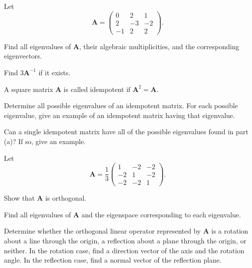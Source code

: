 \begin{problem}
Let
\[
\mathbf A=
\begin{pmatrix}
0&2&1\\
2&-3&-2\\
-1&2&2
\end{pmatrix}.
\]
\begin{problemsubparts}
\item Find all eigenvalues of $\mathbf A$, their algebraic multiplicities, and the corresponding eigenvectors.
\item Find $3\mathbf A^{-1}$ if it exists.
\end{problemsubparts}
\end{problem}

\begin{problem}
A square matrix $\mathbf A$ is called idempotent if $\mathbf A^2=\mathbf A$.
\begin{problemsubparts}
\item Determine all possible eigenvalues of an idempotent matrix. For each possible eigenvalue, give an example of an idempotent matrix having that eigenvalue.
\item Can a single idempotent matrix have all of the possible eigenvalues found in part \textup{(a)}? If so, give an example.
\end{problemsubparts}
\end{problem}

\begin{problem}
Let
\[
\mathbf A=
\frac13
\begin{pmatrix}
1&-2&-2\\
-2&1&-2\\
-2&-2&1
\end{pmatrix}.
\]
\begin{problemsubparts}
\item Show that $\mathbf A$ is orthogonal.
\item Find all eigenvalues of $\mathbf A$ and the eigenspace corresponding to each eigenvalue.
\item Determine whether the orthogonal linear operator represented by $\mathbf A$ is a rotation about a line through the origin, a reflection about a plane through the origin, or neither. In the rotation case, find a direction vector of the axis and the rotation angle. In the reflection case, find a normal vector of the reflection plane.
\end{problemsubparts}
\end{problem}

